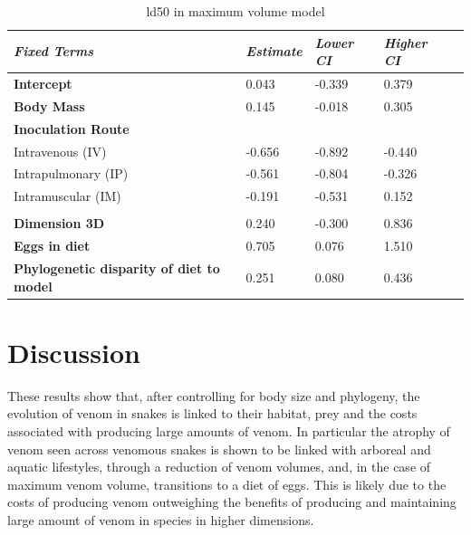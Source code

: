 \begin{table}[h!]
  \centering
    \caption[Table 6.]{ld50 in maximum volume model}
\begin{tabular}{*5l}    \toprule
\emph{Fixed Terms} & \emph{Estimate} & \emph{Lower CI} & \emph{Higher CI}\\\midrule
\textbf{Intercept} & 0.043  & -0.339 & 0.379 \\ 
\textbf{Body Mass} & 0.145  & -0.018 & 0.305 \\ 
\textbf{Inoculation Route} &  &  &  \\ 
 Intravenous (IV) & -0.656 & -0.892 & -0.440 \\
 Intrapulmonary (IP) & -0.561 & -0.804 & -0.326 \\ 
 Intramuscular (IM) & -0.191 & -0.531 & 0.152 \\
  &  &  &  \\ 
\textbf{Dimension 3D} & 0.240 & -0.300 & 0.836 \\ 
\textbf{Eggs in diet} & 0.705 & 0.076 & 1.510 \\ 
\textbf{Phylogenetic disparity of diet to model} & 0.251 & 0.080 & 0.436 \\\bottomrule
 \hline
\end{tabular}
  \label{tbl:Table 6.}
\end{table}




\section{Discussion}


These results show that, after controlling for body size and phylogeny, the evolution of venom in snakes is linked to their habitat, prey and the costs associated with producing large amounts of venom. In particular the atrophy of venom seen across venomous snakes is shown to be linked with arboreal and aquatic lifestyles, through a reduction of venom volumes,  and, in the case of maximum venom volume, transitions to a diet of eggs. This is likely due to the costs of producing venom \citep{pintor2010costs} outweighing the benefits of producing and maintaining large amount of venom in species in higher dimensions. 


